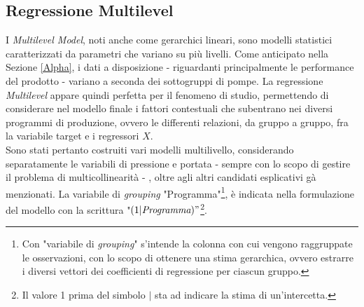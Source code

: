 \documentclass[fleqn,10pt]{SelfArx} %
\begin{document}
\subsection{Regressione Multilevel}
I \textit{Multilevel Model}, noti anche come gerarchici lineari, sono modelli statistici caratterizzati da parametri che variano su più livelli. Come anticipato nella Sezione \ref{Alpha}, i dati a disposizione - riguardanti principalmente le performance del prodotto - variano a seconda dei sottogruppi di pompe. La regressione \textit{Multilevel} appare quindi perfetta per il fenomeno di studio, permettendo di considerare nel modello finale i fattori contestuali che subentrano nei diversi programmi di produzione, ovvero le differenti relazioni, da gruppo a gruppo, fra la variabile target e i regressori $X$.\\
Sono stati pertanto costruiti vari modelli multilivello, considerando separatamente le variabili di pressione e portata - sempre con lo scopo di gestire il problema di multicollinearità - , oltre agli altri candidati esplicativi gà menzionati. La variabile di \textit{grouping} "Programma"\footnote{Con "variabile di \textit{grouping}" s'intende la colonna con cui vengono raggruppate le osservazioni, con lo scopo di ottenere una stima gerarchica, ovvero estrarre i diversi vettori dei coefficienti di regressione per ciascun gruppo.}, è indicata nella formulazione del modello con la scrittura "$(1|\textit{Programma})"$\footnote{Il valore 1 prima del simbolo $\mid$ sta ad indicare la stima di un'intercetta.}. 
\end{document}
